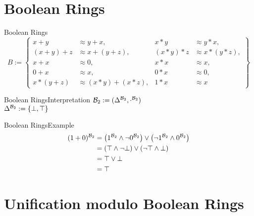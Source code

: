 \section{Boolean Rings}
\begin{frame}{Boolean Rings}
\[B:=\left\lbrace 
	\begin{aligned}
		x+y     & \approx y+x,         & x*y     & \approx y*x,     \\
		(x+y)+z & \approx x+(y+z),     & (x*y)*z & \approx x*(y*z), \\
		x+x     & \approx 0,           & x*x     & \approx x,       \\
		0+x     & \approx x,           & 0*x     & \approx 0,       \\
		x*(y+z) & \approx (x*y)+(x*z), & 1*x     & \approx x        
	\end{aligned}
	\right\rbrace \]
\end{frame}

\begin{frame}{Boolean Rings}{Interpretation}
${\mathcal{B}_2}:=(\Delta^{\mathcal{B}_2},\cdot^{\mathcal{B}_2})$\\
\vspace{10pt}\hspace{10pt}
$\Delta^{\mathcal{B}_2}:=\left\lbrace\bot,\top\right\rbrace$
\end{frame}

\begin{frame}{Boolean Rings}{Example}	
\begin{align*}
	(1+0)^{\mathcal{B}_2}&=\left( 1^{\mathcal{B}_2}\wedge\neg 0^{\mathcal{B}_2}\right) \vee \left( \neg1^{\mathcal{B}_2}\wedge 0^{\mathcal{B}_2}\right) \\
	&=\left( \top\wedge\neg\bot\right) \vee\left(\neg\top\wedge\bot \right) \\
	&=\top\vee\bot\\
	&=\top
\end{align*}
\end{frame}


\section{Unification modulo Boolean Rings}

